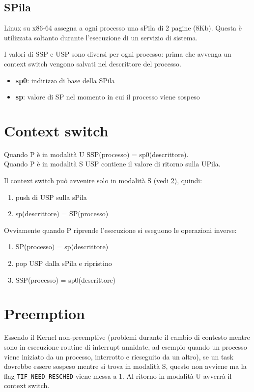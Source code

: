 \documentclass[12pt, a4paper]{report}
\begin{document}
\subsection{SPila}
Linux su x86-64 assegna a ogni processo una sPila di 2 pagine (8Kb). Questa è
utilizzata soltanto durante l'esecuzione di un servizio di sistema.

I valori di SSP e USP sono diversi per ogni processo: prima che avvenga un
context switch vengono salvati nel descrittore del processo.
\begin{itemize}
	\item \textbf{sp0}: indirizzo di base della SPila
	\item \textbf{sp}: valore di SP nel momento in cui il processo viene sospeso
\end{itemize}

\section{Context switch}
Quando P è in modalità U SSP(processo) = sp0(descrittore).\\
Quando P è in modalità S USP contiene il valore di ritorno sulla UPila.

Il context switch può avvenire solo in modalità S (vedi \ref{preemption}),
quindi:
\begin{enumerate}
	\item push di USP sulla sPila
	\item sp(descrittore) = SP(processo)
\end{enumerate}
Ovviamente quando P riprende l'esecuzione si eseguono le operazioni inverse:
\begin{enumerate}
	\item SP(processo) = sp(descrittore)
	\item pop USP dalla sPila e ripristino
	\item SSP(processo) = sp0(descrittore)
\end{enumerate}


\section{Preemption} \label{preemption}
Essendo il Kernel non-preemptive (problemi durante il cambio di contesto mentre
sono in esecuzione routine di interrupt annidate, ad esempio quando un processo
viene iniziato da un processo, interrotto e rieseguito da un altro), se un task
dovrebbe essere sospeso mentre si trova in modalità S, questo non avviene ma la
flag \texttt{TIF\_NEED\_RESCHED} viene messa a 1. Al ritorno in modalità U
avverrà il context switch.
\end{document}
